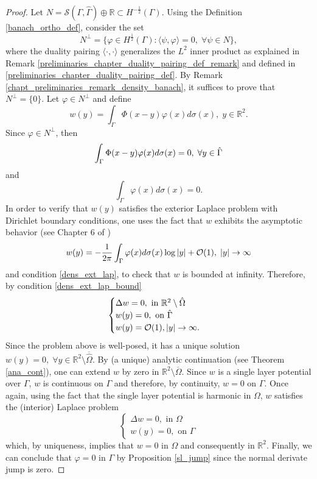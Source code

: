 \begin{proof}
    Let \(N = \mathcal{S}(\Gamma, \hat{\Gamma}) \oplus \mathbb{R} \subset H^{-\frac{1}{2}}(\Gamma)\). Using the Definition \ref{banach_ortho_def}, consider the set
    \[
         N^\perp = \{\varphi \in H^{\frac{1}{2}}(\Gamma): \langle \psi, \varphi \rangle = 0, \; \forall \psi \in N\},
    \]
    where the duality pairing \(\langle \cdot, \cdot \rangle\) generalizes the \(L^2\) inner product as explained in Remark \ref{preliminaries_chapter_duality_pairing_def_remark} and defined in \eqref{preliminaries_chapter_duality_pairing_def}.
    By Remark \ref{chapt_preliminaries_remark_density_banach}, it suffices to prove that \(N^\perp = \{0\}\). Let \(\varphi \in N^\perp\) and define
    \[
        w(y) = \int_\Gamma\Phi(x-y)\varphi(x) d\sigma(x), \; y \in \mathbb{R}^2.
    \]
    Since \(\varphi \in N^\perp\), then
    \begin{equation}\label{dens_ext_lap_bound}
        \int_\Gamma\Phi(x-y)\varphi(x) d\sigma(x) = 0, \; \forall y \in \hat{\Gamma}\\
    \end{equation}
    and
    \begin{equation}\label{dens_ext_lap}
        \int_\Gamma \varphi (x) d\sigma(x) = 0.
    \end{equation}
    In order to verify that \(w(y)\) satisfies the exterior Laplace problem with Dirichlet boundary conditions, one uses the fact that \(w\) exhibits the asymptotic behavior (see Chapter 6 of \cite{kress2013linear})
    \[
        w(y) = -\frac{1}{2 \pi} \int_\Gamma \varphi (x) d\sigma(x) \log \abs{y} + \mathcal{O}(1), \; \abs{y} \rightarrow \infty
    \]
    and condition \eqref{dens_ext_lap}, to check that \(w\) is bounded at infinity. Therefore, by condition \eqref{dens_ext_lap_bound}
    \[
        \begin{cases}
            \Delta w = 0, \text{ in } \mathbb{R}^2\setminus \hat{\Omega}\\
            w(y) = 0, \text{ on } \hat{\Gamma}\\
            w(y) = \mathcal{O}(1), \abs{y} \rightarrow \infty.
        \end{cases}
    \]
    Since the problem above is well-posed, it has a unique solution \(w(y) = 0, \; \forall y \in \mathbb{R}^2\setminus\overline{\hat{\Omega}}\). By (a unique) analytic continuation (see Theorem \ref{ana_cont}), one can extend \(w\) by zero in \(\mathbb{R}^2\setminus\overline{\Omega}\). Since \(w\) is a single layer potential over \(\Gamma\), \(w\) is continuous on \(\Gamma\) and therefore, by continuity, \(w = 0\) on \(\Gamma\). Once again, using the fact that the single layer potential is harmonic in \(\Omega\), \(w\) satisfies the (interior) Laplace problem
    \[
        \begin{cases}
            \Delta w = 0, \text{ in } \Omega\\
            w(y) = 0, \text{ on } \Gamma
        \end{cases}
    \]
    which, by uniqueness, implies that \(w = 0\) in \(\Omega\) and consequently in \(\mathbb{R}^2\). Finally, we can conclude that \(\varphi = 0\) in \(\Gamma\) by Proposition \ref{sl_jump} since the normal derivate jump is zero.


\end{proof}
